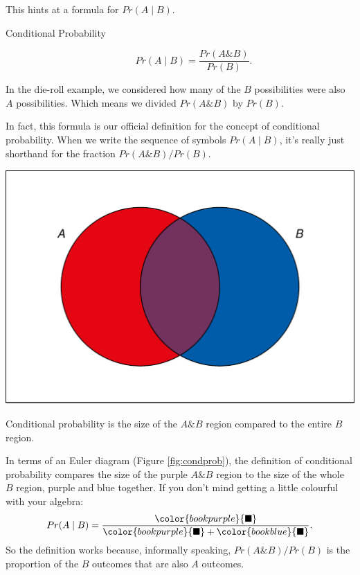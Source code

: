 \documentclass[justified]{tufte-book}
\newcommand{\given}{\mid}
\renewcommand{\wedge}{\mathbin{\&}}
\newcommand{\p}{Pr}
\theoremstyle{definition}
\theoremstyle{definition}
\theoremstyle{definition}
\theoremstyle{remark}
\begin{document}
This hints at a formula for \(\p(A \given B)\).

\begin{description}
\item[Conditional Probability]
\[ \p(A \given B) = \frac{\p(A \wedge B)}{\p(B)}. \]
\end{description}

In the die-roll example, we considered how many of the \(B\) possibilities were also \(A\) possibilities. Which means we divided \(\p(A \wedge B)\) by \(\p(B)\).

In fact, this formula is our official definition for the concept of conditional probability. When we write the sequence of symbols \(\p(A \given B)\), it's really just shorthand for the fraction \(\p(A \wedge B) / \p(B)\).

\begin{marginfigure}
\includegraphics{_main_files/figure-latex/condprob-1} \caption[Conditional probability is the size of the $A \wedge B$ region compared to the entire $B$ region]{Conditional probability is the size of the $A \wedge B$ region compared to the entire $B$ region.}\label{fig:condprob}
\end{marginfigure}

In terms of an Euler diagram (Figure \ref{fig:condprob}), the definition of conditional probability compares the size of the purple \(A \wedge B\) region to the size of the whole \(B\) region, purple and blue together. If you don't mind getting a little colourful with your algebra:
\[
  \p(A \given B) = \frac{\color{bookpurple}{\blacksquare}}{\color{bookpurple}{\blacksquare} + \color{bookblue}{\blacksquare}}.
\]
So the definition works because, informally speaking, \(\p(A \wedge B)/\p(B)\) is the proportion of the \(B\) outcomes that are also \(A\) outcomes.
\end{document}
